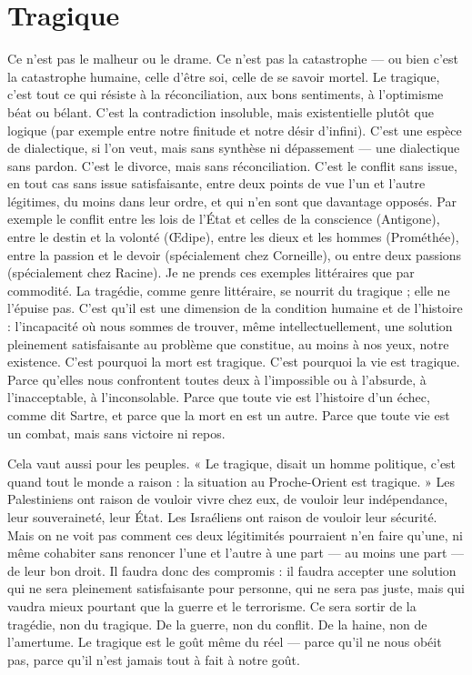 \section{Tragique}
Ce n’est pas le malheur ou le drame. Ce n’est pas la catastrophe
— ou bien c’est la catastrophe humaine, celle d’être soi, celle de
se savoir mortel. Le tragique, c’est tout ce qui résiste à la réconciliation, aux
bons sentiments, à l’optimisme béat ou bélant. C’est la contradiction insoluble,
mais existentielle plutôt que logique (par exemple entre notre finitude et notre
désir d’infini). C’est une espèce de dialectique, si l’on veut, mais sans synthèse
ni dépassement — une dialectique sans pardon. C’est le divorce, mais sans
réconciliation. C’est le conflit sans issue, en tout cas sans issue satisfaisante,
entre deux points de vue l’un et l’autre légitimes, du moins dans leur ordre, et
qui n’en sont que davantage opposés. Par exemple le conflit entre les lois de
l’État et celles de la conscience (Antigone), entre le destin et la volonté
(Œdipe), entre les dieux et les hommes (Prométhée), entre la passion et le
devoir (spécialement chez Corneille), ou entre deux passions (spécialement
chez Racine). Je ne prends ces exemples littéraires que par commodité. La
tragédie, comme genre littéraire, se nourrit du tragique ; elle ne l’épuise pas.
C’est qu’il est une dimension de la condition humaine et de l’histoire : l’incapacité
où nous sommes de trouver, même intellectuellement, une solution pleinement
satisfaisante au problème que constitue, au moins à nos yeux, notre
existence. C’est pourquoi la mort est tragique. C’est pourquoi la vie est tragique.
Parce qu'elles nous confrontent toutes deux à l'impossible ou à
l'absurde, à l’inacceptable, à l’inconsolable. Parce que toute vie est l’histoire
d’un échec, comme dit Sartre, et parce que la mort en est un autre. Parce que
toute vie est un combat, mais sans victoire ni repos.

Cela vaut aussi pour les peuples. « Le tragique, disait un homme politique,
c’est quand tout le monde a raison : la situation au Proche-Orient est
tragique. » Les Palestiniens ont raison de vouloir vivre chez eux, de vouloir
leur indépendance, leur souveraineté, leur État. Les Israéliens ont raison de
vouloir leur sécurité. Mais on ne voit pas comment ces deux légitimités pourraient
n’en faire qu’une, ni même cohabiter sans renoncer l’une et l’autre à
une part — au moins une part — de leur bon droit. Il faudra donc des
compromis : il faudra accepter une solution qui ne sera pleinement satisfaisante
pour personne, qui ne sera pas juste, mais qui vaudra mieux pourtant
que la guerre et le terrorisme. Ce sera sortir de la tragédie, non du tragique.
De la guerre, non du conflit. De la haine, non de l’amertume. Le tragique est
le goût même du réel — parce qu’il ne nous obéit pas, parce qu’il n’est jamais
tout à fait à notre goût.

